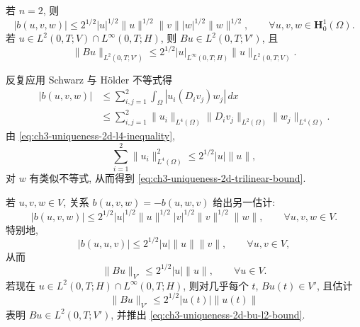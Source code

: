\hypertarget{chapter-03-page-213}{}
\begin{Lemma}
\label{lem:ch3-trilinear-2d}
若 $n=2$, 则
\begin{equation}
|b(u,v,w)|\leq2^{1/2}|u|^{1/2}\lVert u\rVert^{1/2}
\lVert v\rVert|w|^{1/2}\lVert w\rVert^{1/2},
\qquad\forall u,v,w\in\mathbf H_0^1(\Omega).
\label{eq:ch3-uniqueness-2d-trilinear-bound}
\end{equation}
若 $u\in L^2(0,T;V)\cap L^\infty(0,T;H)$, 则 $Bu\in L^2(0,T;V')$, 且
\begin{equation}
\lVert Bu\rVert_{L^2(0,T;V')}
\leq2^{1/2}|u|_{L^\infty(0,T;H)}\lVert u\rVert_{L^2(0,T;V)}.
\label{eq:ch3-uniqueness-2d-bu-l2-bound}
\end{equation}
\end{Lemma}

\begin{Proof}
反复应用 Schwarz 与 Hölder 不等式得
\[
\begin{aligned}
|b(u,v,w)|
&\leq\sum_{i,j=1}^{2}\int_\Omega|u_i(D_iv_j)w_j|\,dx\\
&\leq\sum_{i,j=1}^{2}\lVert u_i\rVert_{L^4(\Omega)}
\lVert D_iv_j\rVert_{L^2(\Omega)}\lVert w_j\rVert_{L^4(\Omega)}.
\end{aligned}
\]
由 \eqref{eq:ch3-uniqueness-2d-l4-inequality},
\[
\sum_{i=1}^{2}\lVert u_i\rVert_{L^4(\Omega)}^2
\leq2^{1/2}|u|\lVert u\rVert,
\]
对 $w$ 有类似不等式, 从而得到 \eqref{eq:ch3-uniqueness-2d-trilinear-bound}.

若 $u,v,w\in V$, 关系 $b(u,v,w)=-b(u,w,v)$ 给出另一估计:
\begin{equation}
|b(u,v,w)|\leq2^{1/2}|u|^{1/2}\lVert u\rVert^{1/2}
|v|^{1/2}\lVert v\rVert^{1/2}\lVert w\rVert,
\qquad\forall u,v,w\in V.
\label{eq:ch3-uniqueness-2d-alternate-trilinear-bound}
\end{equation}
特别地,
\begin{equation}
|b(u,u,v)|\leq2^{1/2}|u|\lVert u\rVert\lVert v\rVert,
\qquad\forall u,v\in V,
\label{eq:ch3-uniqueness-2d-buu-bound}
\end{equation}
从而
\begin{equation}
\lVert Bu\rVert_{V'}\leq2^{1/2}|u|\lVert u\rVert,
\qquad\forall u\in V.
\label{eq:ch3-uniqueness-2d-bu-pointwise-bound}
\end{equation}
若现在 $u\in L^2(0,T;H)\cap L^\infty(0,T;H)$, 则对几乎每个 $t$, $Bu(t)\in V'$, 且估计
\begin{equation}
\lVert Bu\rVert_{V'}\leq2^{1/2}|u(t)|\lVert u(t)\rVert
\label{eq:ch3-uniqueness-2d-bu-time-bound}
\end{equation}
表明 $Bu\in L^2(0,T;V')$, 并推出 \eqref{eq:ch3-uniqueness-2d-bu-l2-bound}.
\end{Proof}

